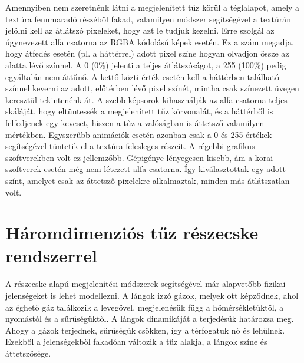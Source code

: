 Amennyiben nem szeretnénk látni a megjelenített tűz körül a téglalapot, amely a textúra fennmaradó részéből fakad, valamilyen módszer segítségével a textúrán jelölni kell az átlátszó pixeleket, hogy azt le tudjuk kezelni. Erre szolgál az úgynevezett alfa csatorna az RGBA kódolású képek esetén. Ez a szám megadja, hogy átfedés esetén (pl. a háttérrel) adott pixel színe hogyan olvadjon össze az alatta lévő színnel.  A 0 (0\%) jelenti a teljes átlátszóságot, a 255 (100\%) pedig egyáltalán nem áttűnő. A kettő közti érték esetén kell a háttérben található színnel keverni az adott, előtérben lévő pixel színét, mintha csak színezett üvegen keresztül tekintenénk át. A szebb képsorok kihasználják az alfa csatorna teljes skáláját, hogy eltüntessék a megjelenített tűz körvonalát, és a háttérből is felfedjenek egy keveset, hiszen a tűz a valóságban is áttetsző valamilyen mértékben. Egyszerűbb animációk esetén azonban csak a 0 és 255 értékek segítségével tüntetik el a textúra felesleges részeit. A régebbi grafikus szoftverekben volt ez jellemzőbb. Gépigénye lényegesen kisebb, ám a korai szoftverek esetén még nem létezett alfa csatorna. Így kiválasztottak egy adott színt, amelyet csak az áttetsző pixelekre alkalmaztak, minden más átlátszatlan volt.








\section{Háromdimenziós tűz részecske rendszerrel}

A részecske alapú megjelenítési módszerek segítségével már alapvetőbb fizikai jelenségeket is lehet modellezni. A lángok izzó gázok, melyek ott képződnek, ahol az éghető gáz találkozik a levegővel, megjelenésük függ a hőmérsékletüktől, a nyomástól és a sűrűségüktől. A lángok dinamikáját a terjedésük határozza meg. Ahogy a gázok terjednek, sűrűségük csökken, így a térfogatuk nő és lehűlnek. Ezekből a jelenségekből fakadóan változik a tűz alakja, a lángok színe és áttetszősége. 

